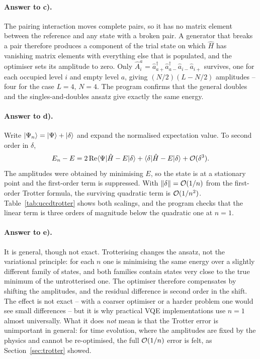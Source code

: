 \paragraph{Answer to c).}
The pairing interaction moves complete pairs, so it has no matrix element
between the reference and any state with a broken pair.  A generator that
breaks a pair therefore produces a component of the trial state on which
$\hat{H}$ has vanishing matrix elements with everything else that is
populated, and the optimiser sets its amplitude to zero.  Only
$\hat{A}_i^a=\hat{a}^{\dagger}_{a+}\hat{a}^{\dagger}_{a-}
\hat{a}_{i-}\hat{a}_{i+}$ survives, one for each occupied level $i$ and empty
level $a$, giving $(N/2)(L-N/2)$ amplitudes -- four for the case $L=4$,
$N=4$.  The program confirms that the general doubles and the
singles-and-doubles ansatz give exactly the same energy.

\paragraph{Answer to d).}
Write $\vert \Psi_n \rangle=\vert \Psi \rangle+\vert \delta \rangle$ and expand the normalised
expectation value.  To second order in $\delta$,
\begin{equation}
  E_n - E = 2\,\mathrm{Re}\langle \Psi | \hat{H}-E | \delta \rangle
    + \langle \delta | \hat{H}-E | \delta \rangle + \mathcal{O}(\delta^3).
  \label{eq:10-exd6}
\end{equation}
The amplitudes were obtained by minimising $E$, so the state is at a
stationary point and the first-order term is suppressed.  With
$\Vert\delta\Vert=\mathcal{O}(1/n)$ from the first-order Trotter formula, the
surviving quadratic term is $\mathcal{O}(1/n^2)$.  Table~\ref{tab:uccdtrotter}
shows both scalings, and the program checks that the linear term is three
orders of magnitude below the quadratic one at $n=1$.

\paragraph{Answer to e).}
It is general, though not exact.  Trotterising changes the ansatz, not the
variational principle: for each $n$ one is minimising the same energy over a
slightly different family of states, and both families contain states very
close to the true minimum of the untrotterised one.  The optimiser therefore
compensates by shifting the amplitudes, and the residual difference is second
order in the shift.  The effect is not exact -- with a coarser optimiser or a
harder problem one would see small differences -- but it is why practical VQE
implementations use $n=1$ almost universally.  What it does \emph{not} mean
is that the Trotter error is unimportant in general: for time evolution,
where the amplitudes are fixed by the physics and cannot be re-optimised, the
full $\mathcal{O}(1/n)$ error is felt, as Section~\ref{sec:trotter} showed.

